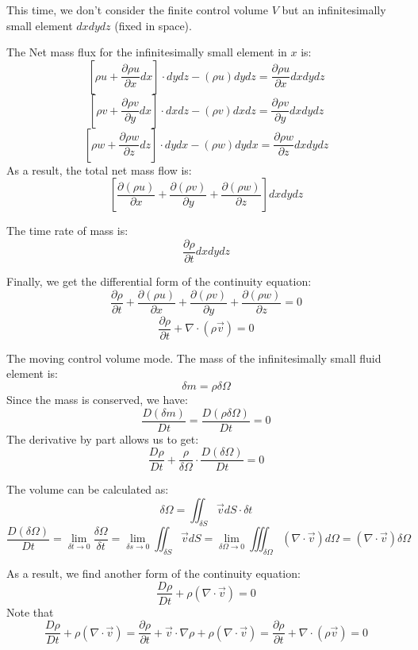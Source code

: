 \documentclass[11pt]{article} %
\begin{document}
This time, we don't consider the finite control volume $V$ but an infinitesimally small element $dxdydz$ (fixed in space).\par
The Net mass flux for the infinitesimally small element in $x$ is:
$$
\left[ \rho u + \frac{\partial \rho u}{\partial x}dx\right] \cdot dydz 
-(\rho u) dydz = \frac{\partial \rho u}{\partial x}dxdydz
$$
$$
\left[ \rho v + \frac{\partial \rho v}{\partial y}dx\right] \cdot dxdz 
-(\rho v) dxdz = \frac{\partial \rho v}{\partial y}dxdydz
$$
$$
\left[ \rho w + \frac{\partial \rho w}{\partial z}dz\right] \cdot dydx 
-(\rho w) dydx = \frac{\partial \rho w}{\partial z}dxdydz
$$As a result, the total net mass flow is:
$$
\left[\frac{\partial (\rho u)}{\partial x}+\frac{\partial (\rho v)}{\partial y}+ \frac{\partial (\rho w)}{\partial z}\right]dxdydz
$$\par
The time rate of mass is:
$$
\frac{\partial \rho}{\partial t}dxdydz
$$\par
Finally, we get the differential form of the continuity equation:
\begin{equation}
\frac{\partial \rho}{\partial t} +\frac{\partial (\rho u)}{\partial x}+\frac{\partial (\rho v)}{\partial y}+ \frac{\partial (\rho w)}{\partial z} = 0
\end{equation}
$$
\frac{\partial \rho}{\partial t} +\nabla \cdot(\rho \vec{v})=0
$$\par
The moving control volume mode. The mass of the infinitesimally small fluid element is:
$$
\delta m = \rho \delta \Omega
$$
Since the mass is conserved, we have:
$$
\frac{D (\delta m)}{Dt} = \frac{D (\rho \delta \Omega)}{Dt}= 0
$$
The derivative by part allows us to get:
$$
\frac{D \rho}{Dt} + \frac{\rho}{\delta \Omega}\cdot\frac{D ( \delta \Omega)}{Dt}= 0
$$\par
The volume can be calculated as:
$$
\delta \Omega = \iint_{\delta S}\vec{v}dS \cdot \delta t
$$
$$
\frac{D ( \delta \Omega)}{Dt} =\lim_{\delta t \to 0} \frac{\delta \Omega}{\delta t}=\lim_{\delta s \to 0}\iint_{\delta S}\vec{v}dS =\lim_{\delta \Omega \to 0}\iiint_{\delta \Omega} (\nabla \cdot \vec{v})d \Omega = (\nabla \cdot \vec{v})\delta \Omega
$$\par
As a result, we find another form of the continuity equation:
\begin{equation}
\frac{D \rho}{Dt} + \rho  (\nabla \cdot \vec{v})= 0
\end{equation}
Note that
$$
\frac{D \rho}{Dt} + \rho  (\nabla \cdot \vec{v}) = \frac{\partial \rho}{\partial t} + \vec{v} \cdot\nabla \rho + \rho  (\nabla \cdot \vec{v}) = \frac{\partial \rho}{\partial t} + \nabla \cdot(\rho \vec{v})=0
$$
\end{document}
